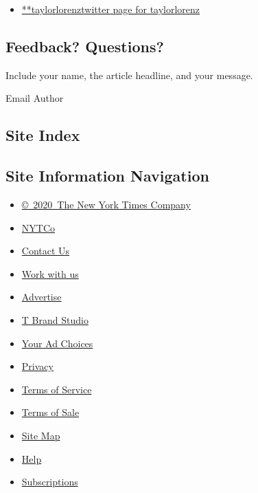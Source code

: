 \begin{itemize}
\tightlist
\item
  \href{https://twitter.com/taylorlorenz}{**taylorlorenztwitter page for
  taylorlorenz}
\end{itemize}

\hypertarget{feedback-questions}{%
\subsection{Feedback? Questions?}\label{feedback-questions}}

Include your name, the article headline, and your message.

Email Author

\hypertarget{site-index}{%
\subsection{Site Index}\label{site-index}}

\hypertarget{site-information-navigation}{%
\subsection{Site Information
Navigation}\label{site-information-navigation}}

\begin{itemize}
\tightlist
\item
  \href{https://help.nytimes3xbfgragh.onion/hc/en-us/articles/115014792127-Copyright-notice}{©~2020~The
  New York Times Company}
\end{itemize}

\begin{itemize}
\tightlist
\item
  \href{https://www.nytco.com/}{NYTCo}
\item
  \href{https://help.nytimes3xbfgragh.onion/hc/en-us/articles/115015385887-Contact-Us}{Contact
  Us}
\item
  \href{https://www.nytco.com/careers/}{Work with us}
\item
  \href{https://nytmediakit.com/}{Advertise}
\item
  \href{http://www.tbrandstudio.com/}{T Brand Studio}
\item
  \href{https://www.nytimes3xbfgragh.onion/privacy/cookie-policy\#how-do-i-manage-trackers}{Your
  Ad Choices}
\item
  \href{https://www.nytimes3xbfgragh.onion/privacy}{Privacy}
\item
  \href{https://help.nytimes3xbfgragh.onion/hc/en-us/articles/115014893428-Terms-of-service}{Terms
  of Service}
\item
  \href{https://help.nytimes3xbfgragh.onion/hc/en-us/articles/115014893968-Terms-of-sale}{Terms
  of Sale}
\item
  \href{https://spiderbites.nytimes3xbfgragh.onion}{Site Map}
\item
  \href{https://help.nytimes3xbfgragh.onion/hc/en-us}{Help}
\item
  \href{https://www.nytimes3xbfgragh.onion/subscription?campaignId=37WXW}{Subscriptions}
\end{itemize}

